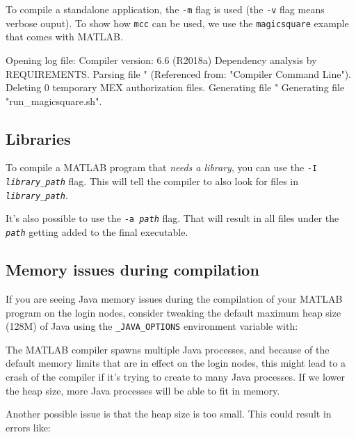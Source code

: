 To compile a standalone application, the \lstinline|-m|
flag is used (the \lstinline|-v| flag means verbose ouput).
To show how \lstinline|mcc| can be used, we use the \lstinline|magicsquare| example
that comes with MATLAB.

\begin{prompt}
Opening log file:  %
Compiler version: 6.6 (R2018a)
Dependency analysis by REQUIREMENTS.
Parsing file "%
	(Referenced from: "Compiler Command Line").
Deleting 0 temporary MEX authorization files.
Generating file "%
Generating file "run\_magicsquare.sh".
\end{prompt}

\subsection{Libraries}

To compile a MATLAB program that \emph{needs a library}, you can use the
\texttt{-I \emph{library\_path}} flag. This will tell the compiler to also
look for files in \texttt{\emph{library\_path}}.

It's also possible to use the \texttt{-a \emph{path}} flag. That will result in
all files under the \texttt{\emph{path}} getting added to the final executable.

\subsection{Memory issues during compilation}

If you are seeing Java memory issues during the compilation of your MATLAB program
on the login nodes, consider tweaking the default maximum heap size (128M) of Java
using the \lstinline|_JAVA_OPTIONS| environment variable with:

\begin{prompt}
\end{prompt}

The MATLAB compiler spawns multiple Java processes, and because of the default memory
limits that are in effect on the login nodes, this might lead to a crash of the compiler
if it's trying to create to many Java processes. If we lower the heap size, more
Java processes will be able to fit in memory.

Another possible issue is that the heap size is too small. This could result
in errors like:

